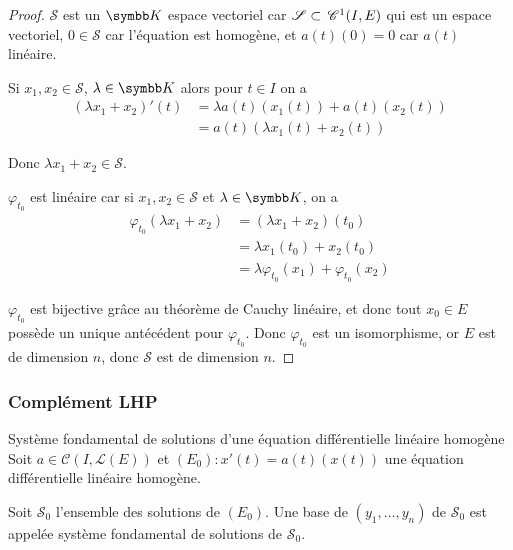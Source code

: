 \begin{proof}
    $\mathscr S$ est un $\K$ espace vectoriel car $\mathscr S \subset \,\mathscr C^{1}(I, E)$ 
    qui est un espace vectoriel, $0 \in \mathscr S$ car l'équation est homogène, et $a(t)(0) = 0$ car 
    $a(t)$ linéaire. 

    Si $x_1, x_2 \in \mathscr S$, $\lambda \in \K$ alors pour $t \in I$ on a 
    \begin{align}
        (\lambda x_1 + x_2)'(t) & = \lambda a(t)(x_1(t)) + a(t)(x_2(t)) \\
        & = a(t)(\lambda x_1(t) + x_2(t))
    \end{align}

    Donc $\lambda x_1 + x_2 \in \mathscr S$.

    $\varphi_{t_0}$ est linéaire car si $x_1, x_2 \in \mathscr S$ et $\lambda \in \K$, on a 
    \begin{align}
        \varphi_{t_0}(\lambda x_1 + x_2) & = (\lambda x_1 + x_2)(t_0) \\
        & = \lambda x_1(t_0) + x_2(t_0) \\
        & = \lambda \varphi_{t_0}(x_1) + \varphi_{t_0}(x_2)
    \end{align}

    $\varphi_{t_0}$ est bijective grâce au théorème de Cauchy linéaire, et donc tout $x_0 \in E$
    possède un unique antécédent pour $\varphi_{t_0}$. Donc $\varphi_{t_0}$ est un isomorphisme, or 
    $E$ est de dimension $n$, donc $\mathscr S$ est de dimension $n$.
\end{proof}

\subsubsection{Complément LHP}

\begin{definitionnt}{Système fondamental de solutions d'une équation différentielle linéaire homogène}{}
    Soit $a \in \mathscr C(I, \mathscr L(E))$ et 
    $(E_0) : x'(t) = a(t)(x(t))$ une équation différentielle linéaire homogène.

    Soit $\mathscr S_0$ l'ensemble des solutions de $(E_0)$. Une base de 
    $(y_1, \dots, y_n)$ de $\mathscr S_0$ est appelée système fondamental de solutions de $\mathscr S_0$.
\end{definitionnt}

